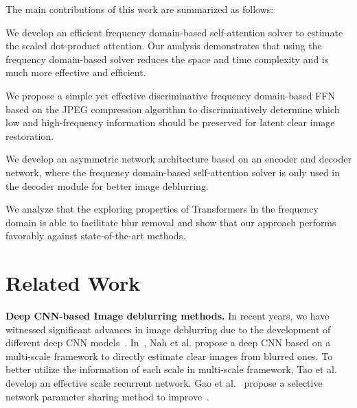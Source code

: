 \documentclass[10pt,twocolumn,letterpaper]{article}
\begin{document}
The main contributions of this work are summarized as follows:
\begin{compactitem}
    \item We develop an efficient frequency domain-based self-attention solver to estimate the scaled dot-product attention. Our analysis demonstrates that using the frequency domain-based solver reduces the space and time complexity and is much more effective and efficient.
    \item We propose a simple yet effective discriminative frequency domain-based FFN based on the JPEG compression algorithm to discriminatively determine which low and high-frequency information should be preserved for latent clear image restoration.
    \item We develop an asymmetric network architecture based on an encoder and decoder network, where the frequency domain-based self-attention solver is only used in the decoder module for better image deblurring.
    \item We analyze that the exploring properties of Transformers in the frequency domain is able to facilitate blur removal and show that our approach performs favorably against state-of-the-art methods.
\end{compactitem}



\section{Related Work}
\vspace{-1mm}
{\flushleft \textbf{Deep CNN-based Image deblurring methods.}}
In recent years, we have witnessed significant advances in image deblurring due to the development of different deep CNN models~\cite{GoPro,SRN,SSN,DMPHN,MPRNet,MIMO,NAFNet}.
In~\cite{GoPro}, Nah et al. propose a deep CNN based on a multi-scale framework to directly estimate clear images from blurred ones.
To better utilize the information of each scale in multi-scale framework, Tao et al.~\cite{SRN} develop an effective scale recurrent network.
Gao et al.~\cite{SSN} propose a selective network parameter sharing method to improve~\cite{GoPro,SRN}.
\end{document}
